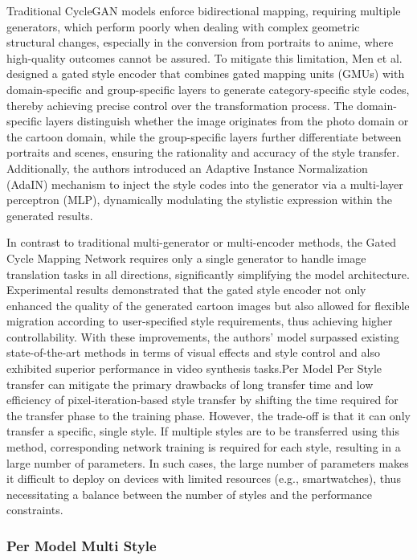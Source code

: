 \documentclass[preprint,12pt]{elsarticle}
\begin{document}
Traditional CycleGAN models enforce bidirectional mapping, requiring multiple generators, which perform poorly when dealing with complex geometric structural changes, especially in the conversion from portraits to anime, where high-quality outcomes cannot be assured. To mitigate this limitation, Men et al. designed a gated style encoder that combines gated mapping units (GMUs) with domain-specific and group-specific layers to generate category-specific style codes, thereby achieving precise control over the transformation process. The domain-specific layers distinguish whether the image originates from the photo domain or the cartoon domain, while the group-specific layers further differentiate between portraits and scenes, ensuring the rationality and accuracy of the style transfer. Additionally, the authors introduced an Adaptive Instance Normalization (AdaIN) mechanism to inject the style codes into the generator via a multi-layer perceptron (MLP), dynamically modulating the stylistic expression within the generated results.

In contrast to traditional multi-generator or multi-encoder methods, the Gated Cycle Mapping Network requires only a single generator to handle image translation tasks in all directions, significantly simplifying the model architecture. Experimental results demonstrated that the gated style encoder not only enhanced the quality of the generated cartoon images but also allowed for flexible migration according to user-specified style requirements, thus achieving higher controllability. With these improvements, the authors' model surpassed existing state-of-the-art methods in terms of visual effects and style control and also exhibited superior performance in video synthesis tasks.Per Model Per Style transfer can mitigate the primary drawbacks of long transfer time and low efficiency of pixel-iteration-based style transfer by shifting the time required for the transfer phase to the training phase. However, the trade-off is that it can only transfer a specific, single style. If multiple styles are to be transferred using this method, corresponding network training is required for each style, resulting in a large number of parameters. In such cases, the large number of parameters makes it difficult to deploy on devices with limited resources (e.g., smartwatches), thus necessitating a balance between the number of styles and the performance constraints.

\subsubsection{Per Model Multi Style}
\end{document}
